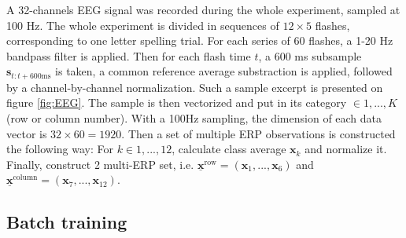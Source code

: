\documentclass[conference]{IEEEtran}
\begin{document}
A 32-channels EEG signal was recorded during the whole experiment, sampled at 100 Hz.
The whole experiment is divided in sequences of $12 \times 5$  flashes, corresponding to one letter spelling trial.
For each series of 60 flashes,  a 1-20 Hz bandpass filter is applied.
Then for each flash time $t$, a 600 ms subsample $\mathbf{s}_{t:t+600 \text{ms}}$ is taken, 
a common reference average substraction is applied, followed by a channel-by-channel normalization.
Such a sample excerpt is presented on figure \ref{fig:EEG}.
The sample is then vectorized and put in its category $\in {1,...,K}$ (row or column number).
With a 100Hz sampling, the dimension of each  data vector is $32 \times 60 = 1920$.
Then a set of multiple ERP observations is constructed the following way:
For $k \in 1,...,12$, calculate class average $\boldsymbol{x}_k$ and normalize it.
Finally, construct 2 multi-ERP set, i.e. $\underline{\mathbf{x}}^\text{row} = (\boldsymbol{x}_1,...,\boldsymbol{x}_6)$ 
and $\underline{\mathbf{x}}^\text{column} = (\boldsymbol{x}_7,...,\boldsymbol{x}_{12})$.


\subsection{Batch training}\label{sec:batch}
\end{document}
